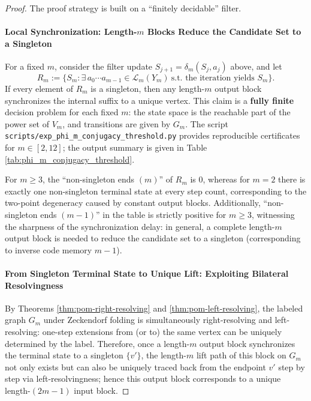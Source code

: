 \begin{proof}
The proof strategy is built on a ``finitely decidable'' filter.

\paragraph{Local Synchronization: Length-$m$ Blocks Reduce the Candidate Set to a Singleton}
For a fixed $m$, consider the filter update $S_{j+1}=\delta_m(S_j,a_j)$ above, and let
$$
R_m:=\{S_m:\exists\,a_0\cdots a_{m-1}\in\mathcal{L}_m(Y_m)\ \text{s.t.\ the iteration yields }S_m\}.
$$
If every element of $R_m$ is a singleton, then any length-$m$ output block synchronizes the internal suffix to a unique vertex.
This claim is a \textbf{fully finite} decision problem for each fixed $m$: the state space is the reachable part of the power set of $V_m$, and transitions are given by $G_m$.
The script \texttt{scripts/exp\_phi\_m\_conjugacy\_threshold.py} provides reproducible certificates for $m\in[2,12]$; the output summary is given in Table \ref{tab:phi_m_conjugacy_threshold}.

For $m\ge 3$, the ``non-singleton ends $(m)$'' of $R_m$ is $0$, whereas for $m=2$ there is exactly one non-singleton terminal state at every step count, corresponding to the two-point degeneracy caused by constant output blocks.
Additionally, ``non-singleton ends $(m-1)$'' in the table is strictly positive for $m\ge 3$, witnessing the sharpness of the synchronization delay: in general, a complete length-$m$ output block is needed to reduce the candidate set to a singleton (corresponding to inverse code memory $m-1$).

\paragraph{From Singleton Terminal State to Unique Lift: Exploiting Bilateral Resolvingness}
By Theorems \ref{thm:pom-right-resolving} and \ref{thm:pom-left-resolving}, the labeled graph $G_m$ under Zeckendorf folding is simultaneously right-resolving and left-resolving: one-step extensions from (or to) the same vertex can be uniquely determined by the label.
Therefore, once a length-$m$ output block synchronizes the terminal state to a singleton $\{v'\}$, the length-$m$ lift path of this block on $G_m$ not only exists but can also be uniquely traced back from the endpoint $v'$ step by step via left-resolvingness; hence this output block corresponds to a unique length-$(2m-1)$ input block.


\end{proof}

